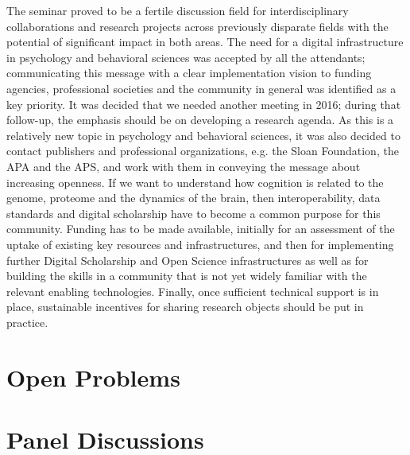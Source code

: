 \documentclass[a4paper,UKenglish]{dagrep}
\begin{document}
The seminar proved to be a fertile discussion field for interdisciplinary
collaborations and research projects across previously disparate fields with the
potential of significant impact in both areas. The need for a digital
infrastructure in psychology and behavioral sciences was accepted by all the
attendants; communicating this message with a clear implementation vision to
funding agencies, professional societies and the community in general was
identified as a key priority. It was decided that we needed another meeting in
2016; during that follow-up, the emphasis should be on developing a research
agenda. As this is a relatively new topic in psychology and behavioral sciences,
it was also decided to contact publishers and professional organizations, e.g.
the Sloan Foundation, the APA and the APS, and work with them in conveying the
message about increasing openness. If we want to understand how cognition is
related to the genome, proteome and the dynamics of the brain, then
interoperability, data standards and digital scholarship have to become a common
purpose for this community. Funding has to be made available, initially for an
assessment of the uptake of existing key resources and infrastructures, and then
for implementing further Digital Scholarship and Open Science infrastructures as
well as for building the skills in a community that is not yet widely familiar
with the relevant enabling technologies. Finally, once sufficient technical
support is in place, sustainable incentives for sharing research objects should
be put in practice.

\section{Open Problems}

\section{Panel Discussions}

 
\end{document}
